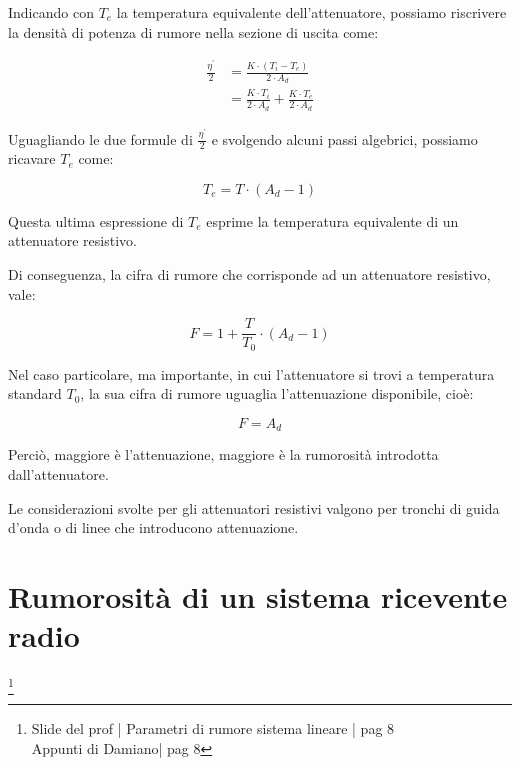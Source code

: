 Indicando con $T_e$ la temperatura equivalente dell'attenuatore, 
possiamo riscrivere la densità di potenza di rumore nella sezione di uscita come: 

{
    \Large 
    \begin{equation}
        \begin{split}
            \frac{\eta^{'}}{2}
            &= 
            \frac{K \cdot (T_i - T_e)}{2 \cdot A_d}
            \\
            &= 
            \frac{K \cdot T_i}{2 \cdot A_d}
            + 
            \frac{K \cdot T_e}{2 \cdot A_d}
        \end{split}
    \end{equation}
}

Uguagliando le due formule di $\frac{\eta^{'}}{2}$ e svolgendo alcuni passi algebrici, 
possiamo ricavare $T_e$ come: 

{
    \Large 
    \begin{equation}
        T_e = T \cdot (A_d - 1)
    \end{equation}
}

Questa ultima espressione di $T_e$ esprime la temperatura equivalente di un attenuatore resistivo. \newline 

Di conseguenza, la cifra di rumore che corrisponde ad un attenuatore resistivo, vale: 

{
    \Large 
    \begin{equation}
        F = 1 + \frac{T}{T_0} \cdot (A_d - 1)
    \end{equation}
}

Nel caso particolare, ma importante, in cui l'attenuatore si trovi a temperatura standard $T_0$, 
la sua cifra di rumore uguaglia l'attenuazione disponibile, cioè: 

{
    \Large 
    \begin{equation}
        F = A_d
    \end{equation}
}

Perciò, maggiore è l'attenuazione, maggiore è la rumorosità introdotta dall'attenuatore. \newline 

Le considerazioni svolte per gli attenuatori resistivi valgono per tronchi di guida d'onda o di linee che introducono attenuazione. \newline 

\newpage

\section{Rumorosità di un sistema ricevente radio}
\footnote{Slide del prof | Parametri di rumore sistema lineare | pag 8 \\  
Appunti di Damiano| pag 8} 

